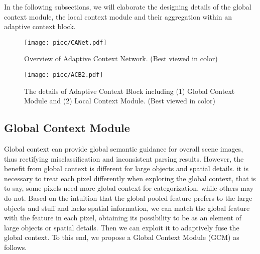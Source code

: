 \documentclass[10pt,twocolumn,letterpaper]{article}
\begin{document}
In the following subsections, we will elaborate the designing details of the global context module, the local context module and their aggregation within an adaptive context block.

\begin{figure}[!t]
        \centering
        \texttt{[image: picc/CANet.pdf]}
        \vspace{-1em}
        \caption{Overview of Adaptive Context Network. (Best viewed in color)}
         \label{CAN}\vspace{-0.5em}
\end{figure}

\begin{figure*}[!t]
        \centering
        \texttt{[image: picc/ACB2.pdf]}
        \caption{The details of Adaptive Context Block including (1) Global Context Module and (2)  Local Context Module. (Best viewed in color)}
         \label{ACB}\vspace{-1em}
\end{figure*}


\subsection{Global Context Module}
Global context can provide global semantic guidance for overall scene images, thus rectifying misclassification and inconsistent parsing results. However, the benefit from global context is different for large objects and spatial details. 
it is necessary to treat each pixel differently when exploring the global context, that is to say, some pixels need more global context for  categorization, while others may do not.
Based on the intuition that the global pooled feature prefers to the large objects and stuff and lacks spatial information, we can match the global feature with the feature in each pixel,  obtaining its possibility to be as an element of large objects or spatial details.   
Then we can exploit it to adaptively fuse the global context.
To this end, we propose a Global Context Module (GCM) as follows.
\end{document}

